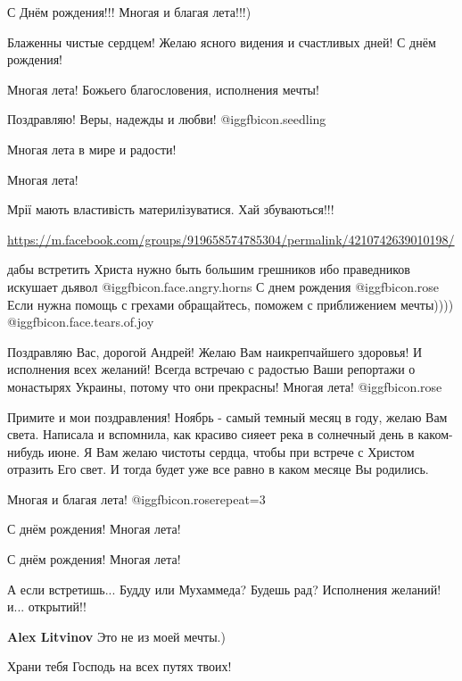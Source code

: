 \begin{itemize}
С Днём рождения!!!
Многая и благая лета!!!)

Блаженны чистые сердцем! Желаю ясного видения и счастливых дней! С днём рождения!

Многая лета! Божьего благословения, исполнения мечты!

Поздравляю! Веры, надежды и любви!  @igg{fbicon.seedling} 

Многая лета в мире и радости!


Многая лета!

Мрії мають властивість материлізуватися. Хай збуваються!!!

\url{https://m.facebook.com/groups/919658574785304/permalink/4210742639010198/}

дабы встретить Христа нужно быть большим грешников ибо праведников искушает дьявол  @igg{fbicon.face.angry.horns} 
С днем рождения  @igg{fbicon.rose} Если нужна помощь с грехами обращайтесь, поможем с приближением мечты))))  @igg{fbicon.face.tears.of.joy} 


Поздравляю Вас, дорогой Андрей! Желаю Вам наикрепчайшего здоровья! И исполнения
всех желаний! Всегда встречаю с радостью Ваши репортажи о монастырях Украины,
потому что они прекрасны! Многая лета!  @igg{fbicon.rose} 


Примите и мои поздравления! Ноябрь - самый темный месяц в году, желаю Вам
света. Написала и вспомнила, как красиво сияеет река в солнечный день в
каком-нибудь июне. Я Вам желаю чистоты сердца, чтобы при встрече с Христом
отразить Его свет. И тогда будет уже все равно в каком месяце Вы родились.

Многая и благая лета!
 @igg{fbicon.rose}{repeat=3} 

С днём рождения! Многая лета!

С днём рождения! Многая лета!

А если встретишь... Будду или Мухаммеда? Будешь рад? Исполнения желаний! и... открытий!!

\textbf{Alex Litvinov} Это не из моей мечты.)

Храни тебя Господь на всех путях твоих!


\end{itemize}
